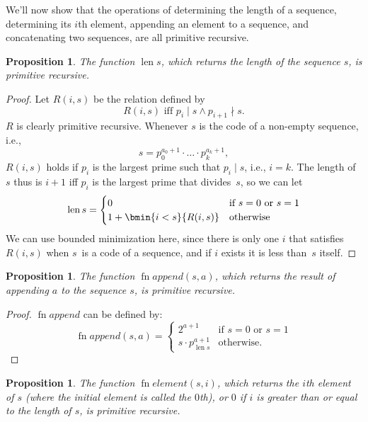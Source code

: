 \documentclass[10pt,a4paper]{article}
\theoremstyle{plain}
\newtheorem{prop}[thm]{Proposition}
\theoremstyle{definition}
\theoremstyle{remark}
\providecommand{\len}{\operatorname{len}}
\providecommand{\fn}{\operatorname{fn}}
\begin{document}
We'll now show that the operations of determining the length of a
sequence, determining its $i$th element, appending an element to a
sequence, and concatenating two sequences, are all primitive
recursive.

\begin{prop}
  The function $\len{s}$, which returns the length of the sequence
  $s$, is primitive recursive.
\end{prop}

\begin{proof}
  Let $R(i, s)$ be the relation defined by
  \[
  R(i, s) \text{ iff }
  p_i \mid s \land p_{i+1} \nmid s.
  \]
  $R$ is clearly primitive recursive. Whenever $s$ is the code of a
  non-empty sequence, i.e.,
  \[
  s = p_0^{a_0+1} \cdot \dots \cdot p_{k}^{a_{k}+1},
  \]
  $R(i,s)$ holds if $p_i$ is the largest prime such that
  $p_i \mid s$, i.e., $i = k$. The length of $s$ thus is $i+1$ iff
  $p_i$ is the largest prime that divides~$s$, so we can let
  \[
  \len{s} =
  \begin{cases}
    0 & \text{if $s = 0$ or $s = 1$} \\
    1 + \bmin{i < s}{R(i, s)} & \text{otherwise}
  \end{cases}
  \]
  We can use bounded minimization here, since there is only one $i$ that
  satisfies $R(i,s)$ when $s$~is a code of a sequence, and if $i$
  exists it is less than~$s$ itself.
\end{proof}

\begin{prop}
  The function $\fn{append}(s,a)$, which returns the result of appending $a$ to
  the sequence $s$, is primitive recursive.
\end{prop}

\begin{proof}
  $\fn{append}$ can be defined by:
  \[
  \fn{append}(s,a) =
  \begin{cases}
    2^{a+1} & \text{if $s = 0$ or $s = 1$} \\
    s \cdot p_{\len{s}}^{a+1} & \text{otherwise.}
  \end{cases}
  \]
\end{proof}

\begin{prop}
  The function $\fn{element}(s,i)$, which returns the $i$th element of $s$
  (where the initial element is called the $0$th), or $0$ if $i$ is
  greater than or equal to the length of $s$, is primitive recursive.
\end{prop}
\end{document}
